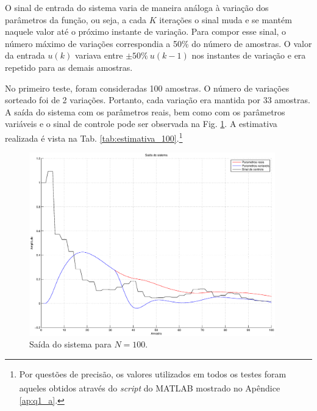 O sinal de entrada do sistema varia de maneira análoga à variação dos parâmetros
da função, ou seja, a cada $K$ iterações o sinal muda e se mantém naquele valor
até o próximo instante de variação. Para compor esse sinal, o número máximo de
variações correspondia a 50\% do número de amostras. O valor da entrada $u(k)$
variava entre $\pm 50\%\ u(k-1)$ nos instantes de variação e era repetido para as
demais amostras.

No primeiro teste, foram consideradas 100 amostras. O número de variações
sorteado foi de 2 variações. Portanto, cada variação era mantida por 33
amostras. A saída do sistema com os parâmetros reais, bem como com os parâmetros
variáveis e o sinal de controle pode ser observada na Fig.
\ref{fig:saida_sist_100}. A estimativa realizada é vista na Tab.
\ref{tab:estimativa_100}.\footnote{Por questões de precisão, os valores
utilizados em todos os testes foram aqueles obtidos através do {\it script} do
MATLAB\textsuperscript{\textregistered} mostrado no Apêndice \ref{ap:q1_a}.}

\begin{figure}[htb]
\centering
    \includegraphics[width=0.95\textwidth]{imgs/questao2/saida_100}
    \caption{Saída do sistema para $N = 100$.}
    \label{fig:saida_sist_100}
\end{figure}

